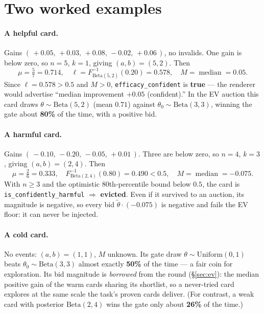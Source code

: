 \documentclass[11pt]{article}
\newcommand{\code}[1]{\texttt{\small #1}}
\newcommand{\Beta}{\mathrm{Beta}}
\begin{document}
\section{Two worked examples}
\label{sec:worked}

\paragraph{A helpful card.} Gains $(\,+0.05,\,+0.03,\,+0.08,\,-0.02,\,+0.06\,)$,
no invalids. One gain is below zero, so $n=5$, $k=1$, giving
$(a,b)=(5,2)$. Then
\[
  \mu = \tfrac{5}{7} = 0.714,\quad
  \ell = F^{-1}_{\Beta(5,2)}(0.20) = 0.578,\quad
  M = \operatorname{median} = 0.05 .
\]
Since $\ell = 0.578 > 0.5$ and $M>0$, \code{efficacy\_confident} is \textbf{true} ---
the renderer would advertise ``median improvement $+0.05$ (confident).'' In the EV
auction this card draws $\theta \sim \Beta(5,2)$ (mean $0.71$) against
$\theta_0 \sim \Beta(3,3)$, winning the gate about \textbf{80\%} of the time, with a
positive bid.

\paragraph{A harmful card.} Gains $(\,-0.10,\,-0.20,\,-0.05,\,+0.01\,)$. Three are
below zero, so $n=4$, $k=3$, giving $(a,b)=(2,4)$. Then
\[
  \mu = \tfrac{2}{6} = 0.333,\quad
  F^{-1}_{\Beta(2,4)}(0.80) = 0.490 < 0.5,\quad
  M = \operatorname{median} = -0.075 .
\]
With $n \ge 3$ and the optimistic 80th-percentile bound below $0.5$, the card is
\code{is\_confidently\_harmful} $\Rightarrow$ \textbf{evicted}. Even if it survived
to an auction, its magnitude is negative, so every bid $\tilde\theta \cdot (-0.075)$
is negative and fails the EV floor: it can never be injected.

\paragraph{A cold card.} No events: $(a,b)=(1,1)$, $M$ unknown. Its gate draw
$\theta \sim \mathrm{Uniform}(0,1)$ beats $\theta_0 \sim \Beta(3,3)$ almost exactly
\textbf{50\%} of the time --- a fair coin for exploration. Its bid magnitude is
\emph{borrowed} from the round (\S\ref{sec:ev}): the median positive gain of the
warm cards sharing its shortlist, so a never-tried card explores at the same scale
the task's proven cards deliver. (For contrast, a weak card with posterior
$\Beta(2,4)$ wins the gate only about \textbf{26\%} of the time.)
\end{document}

